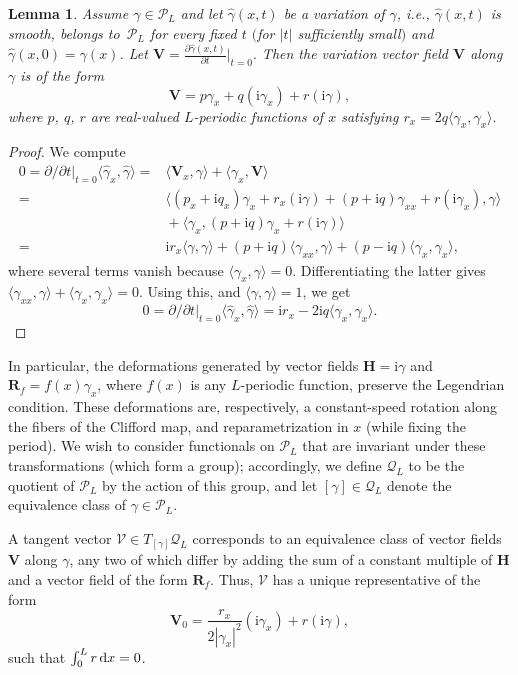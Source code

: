 \documentclass[pdftex]{sigma}
\newcommand\Leg{ {\mathcal P}} %
\newcommand\Legq{\mathcal Q}
\def\ri{\mathrm{i}}
\newcommand\VV{\mathbf V}
\newcommand\VR{\mathbf R}
\newcommand\VH{\mathbf H}
\newcommand\qV{\mathcal V}%
\newcommand{\dx}{\,{\rm d}x}
\def\gam{\gamma} %
\def\di{\partial}
\newcommand\gamf{\widehat{\gam}} %
\newcommand\bert{\big\vert}
\numberwithin{equation}{section}
\newtheorem{Lemma}[Theorem]{Lemma}
\begin{document}
\begin{Lemma}\label{tanque}
Assume $\gam \in \Leg_L$ and let $\gamf(x,t)$ be a variation of $\gam$, i.e., $\gamf(x,t)$ is smooth, belongs to~$\Leg_L$ for every fixed $t$ $($for $|t|$ sufficiently small$)$ and $\gamf(x,0)=\gam(x)$. Let
$\VV = \frac{\partial \gamf(x,t)}{\partial t}\Big|_{t=0}.$
Then the variation vector field $\VV$ along $\gam$ is of the form
\[\VV = p\gam_x + q (\ri\gam_x) + r (\ri \gam),\]
where $p$, $q$, $r$ are real-valued $L$-periodic functions of $x$ satisfying $r_x = 2q \langle\gam_x, \gam_x\rangle.$
\end{Lemma}
\begin{proof}
We compute
\begin{align*}
0=\di/\di{t}\bert_{t=0} \bigl\langle \gamf_x, \gamf \bigr\rangle={}& \langle \VV_x, \gam\rangle + \langle \gam_x, \VV \rangle \\
={}& \langle (p_x+\ri q_x) \gam_x + r_x (\ri \gam) + (p+\ri q)\gam_{xx} + r (\ri \gam_x), \gam\rangle \\
&{}+ \langle \gam_x, (p+\ri q) \gam_x +r(\ri \gam)\rangle\\
={}& \ri r_x \langle \gam,\gam\rangle + (p+\ri q) \langle \gam_{xx}, \gam\rangle + (p-\ri q) \langle \gam_x, \gam_x\rangle,
\end{align*}
where several terms vanish because $\langle \gam_x, \gam \rangle= 0$. Differentiating the latter gives
$\langle \gam_{xx}, \gam\rangle + \langle \gam_x, \gam_x\rangle=0$. Using this, and $\langle \gam, \gam \rangle=1$, we get
\[
0=\di/\di{t}\bert_{t=0} \bigl\langle \gamf_x, \gamf \bigr\rangle = \ri r_x -2\ri q \langle \gam_x, \gam_x \rangle.
\tag*{\qed}
\]
\renewcommand{\qed}{}
\end{proof}

In particular, the deformations generated by vector fields
$\VH = \ri \gam$ and $\VR_f = f(x) \gam_x$, where $f(x)$ is any $L$-periodic function, preserve the Legendrian condition. These deformations are, respectively, a constant-speed rotation along the fibers of the Clifford map, and reparametrization in $x$ (while fixing the period). We wish to consider functionals on $\Leg_L$ that
are invariant under these transformations (which form a group); accordingly, we define $\Legq_L$ to be the quotient of $\Leg_L$ by the action of this group,
and let $[\gam] \in \Legq_L$ denote the equivalence class of $\gam \in \Leg_L$.

A tangent vector $\qV \in T_{[\gamma]} \Legq_L$ corresponds to an equivalence
class of vector fields $\VV$ along $\gam$, any two of which differ by adding the sum of a constant multiple of $\VH$ and a vector field of the form $\VR_f$.
Thus,
$\qV$
has a unique representative of the form
\[\VV_0 =\dfrac{r_x}{2|\gam_x|^2} (\ri \gam_x) + r (\ri \gam), \]
such that $\int_0^L r\dx =0$.
\end{document}
